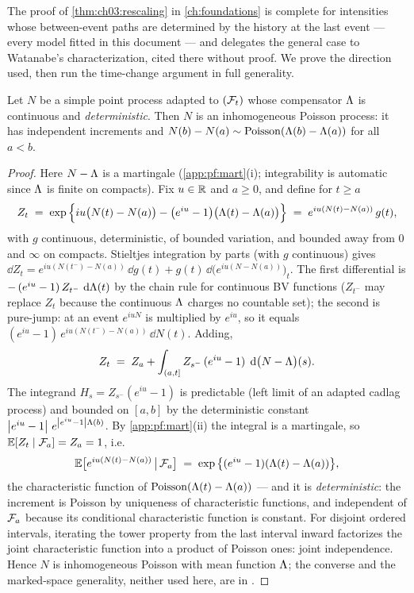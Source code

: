 The proof of \cref{thm:ch03:rescaling} in \cref{ch:foundations} is complete for intensities whose
between-event paths are determined by the history at the last event --- every model fitted in this
document --- and delegates the general case to Watanabe's characterization, cited there without
proof. We prove the direction used, then run the time-change argument in full generality.
\begin{proposition}
\label{app:pf:watanabe}
Let $N$ be a simple point process adapted to $(\mathcal{F}_{t})$ whose compensator $\Lambda$ is continuous and
\emph{deterministic}. Then $N$ is an inhomogeneous Poisson process: it has independent increments and
$N(b) - N(a) \sim \mathrm{Poisson}(\Lambda(b) - \Lambda(a))$ for all $a < b$.
\end{proposition}
\begin{proof}
Here $N - \Lambda$ is a martingale (\cref{app:pf:mart}(i); integrability is automatic since $\Lambda$ is
finite on compacts). Fix $u \in \mathbb{R}$ and $a \ge 0$, and define for $t \ge a$
\begin{equation}
\label{eq:app:pf:expmart}
Z_t \;=\; \exp\Big\{ i u \big(N(t) - N(a)\big) - \big(e^{iu} - 1\big)\big(\Lambda(t) - \Lambda(a)\big)
\Big\} \;=\; e^{iu(N(t)-N(a))}\, g(t),
\end{equation}
with $g$ continuous, deterministic, of bounded variation, and bounded away from $0$ and $\infty$ on
compacts. Stieltjes integration by parts (with $g$ continuous) gives $\dd Z_t =
e^{iu(N(t^-)-N(a))}\, \dd g(t) + g(t)\, \dd\big(e^{iu(N-N(a))}\big)_t$. The first differential is
$-\,(e^{iu}-1)\, Z_{t^-}\, \,\mathrm{d}\Lambda(t)$ by the chain rule for continuous BV functions ($Z_{t^-}$ may
replace $Z_t$ because the continuous $\Lambda$ charges no countable set); the second is pure-jump: at an
event $e^{iuN}$ is multiplied by $e^{iu}$, so it equals $(e^{iu}-1)\, e^{iu(N(t^-)-N(a))}\, \dd N(t)$.
Adding,
\[
Z_t \;=\; Z_a + \int_{(a,t]} Z_{s^-}\,(e^{iu}-1)\; \,\mathrm{d}\big(N - \Lambda\big)(s).
\]
The integrand $H_s = Z_{s^-}(e^{iu}-1)$ is predictable (left limit of an adapted cadlag process) and
bounded on $[a,b]$ by the deterministic constant $\left|e^{iu}-1\right|\, e^{\left|e^{iu}-1\right|\Lambda(b)}$. By
\cref{app:pf:mart}(ii) the integral is a martingale, so $\mathbb{E}[Z_t \mid \mathcal{F}_a] = Z_a = 1$, i.e.
\[
\mathbb{E}\big[ e^{iu(N(t) - N(a))} \,\big|\, \mathcal{F}_a \big]
\;=\; \exp\big\{ (e^{iu} - 1)(\Lambda(t) - \Lambda(a)) \big\},
\]
the characteristic function of $\mathrm{Poisson}(\Lambda(t)-\Lambda(a))$ --- and it is
\emph{deterministic}: the increment is Poisson by uniqueness of characteristic functions, and
independent of $\mathcal{F}_a$ because its conditional characteristic function is constant. For disjoint
ordered intervals, iterating the tower property from the last interval inward factorizes the joint
characteristic function into a product of Poisson ones: joint independence. Hence $N$ is inhomogeneous
Poisson with mean function $\Lambda$; the converse and the marked-space generality, neither used here,
are in \citet{daley2008}.
\end{proof}
